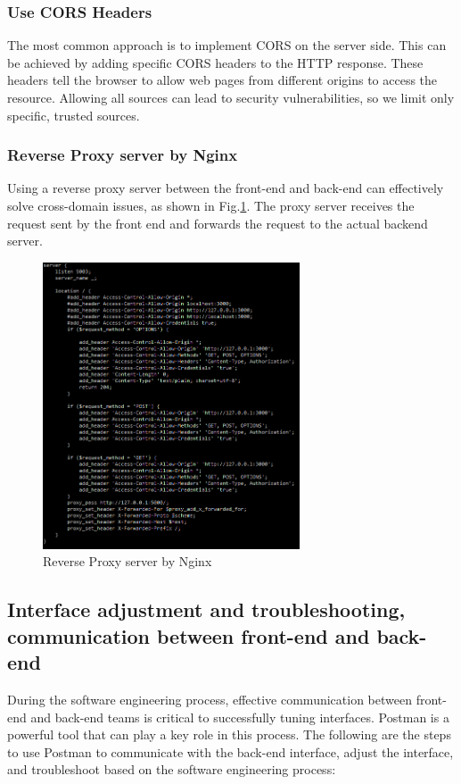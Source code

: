 \documentclass[journal]{IEEEtran}
\begin{document}
\subsubsection{Use CORS Headers}
The most common approach is to implement CORS on the server side. This can be achieved by adding specific CORS headers to the HTTP response. These headers tell the browser to allow web pages from different origins to access the resource. Allowing all sources can lead to security vulnerabilities, so we limit only specific, trusted sources.

\subsubsection{Reverse Proxy server by Nginx}
Using a reverse proxy server between the front-end and back-end can effectively solve cross-domain issues, as shown in Fig.\ref{fig:reversesolution}. The proxy server receives the request sent by the front end and forwards the request to the actual backend server.

\begin{figure}[!t]
  \centering
  \includegraphics[width=3in]{figures/solution-nginx.png}
  \caption{Reverse Proxy server by Nginx}
  \label{fig:reversesolution}
  \end{figure}

\subsection{Interface adjustment and troubleshooting, communication between front-end and back-end}
During the software engineering process, effective communication between front-end and back-end teams is critical to successfully tuning interfaces. Postman is a powerful tool that can play a key role in this process. The following are the steps to use Postman to communicate with the back-end interface, adjust the interface, and troubleshoot based on the software engineering process:
\end{document}
